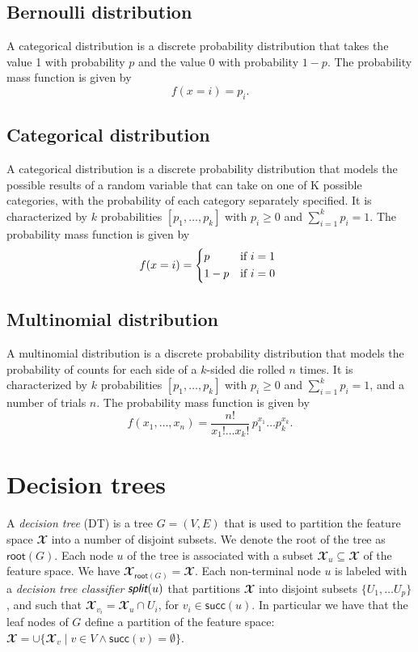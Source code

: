 \documentclass{article}
\newcommand{\func}[1]{\ensuremath{\textsf{#1}}} %
\newcommand{\attr}[1]{\ensuremath{\fontfamily{cmss}\selectfont \textit{#1}}} %
\begin{document}
\subsection{Bernoulli distribution}
A categorical distribution is a discrete probability distribution that takes the value 1 with probability $p$ and the value 0 with probability $1 - p$. The probability mass function is given by
\[
f(x = i) = p_i.
\]

\subsection{Categorical distribution}
A categorical distribution is a discrete probability distribution that models the possible results of a random variable that can take on one of K possible categories, with the probability of each category separately specified. It is characterized by $k$ probabilities $[p_1, \ldots, p_k]$ with $p_i \geq 0$ and $\sum_{i=1}^k p_i = 1$. The probability mass function is given by
\[
f(x = i) =
\begin{cases*}
  p & if $i = 1$ \\
  1 - p & if $i = 0$
\end{cases*}
\]

\subsection{Multinomial distribution}
A multinomial distribution is a discrete probability distribution that models the probability of counts for each side of a $k$-sided die rolled $n$ times. It is characterized by $k$ probabilities $[p_1, \ldots, p_k]$ with $p_i \geq 0$ and $\sum_{i=1}^k p_i = 1$, and a number of trials $n$. The probability mass function is given by
\[
f(x_1, \ldots, x_n) = \frac{n!}{x_1! \ldots x_k!} \, p_1^{x_1} \ldots p_k^{x_k}.
\]

\section{Decision trees}
A \emph{decision tree} (DT) is a tree $G = (V,E)$ that is used to partition the feature space $\mathbfcal{X}$ into a number of disjoint subsets. We denote the root of the tree as $\func{root}(G)$. Each node $u$ of the tree is associated with a subset $\mathbfcal{X}_u \subseteq \mathbfcal{X}$ of the feature space.
We have $\mathbfcal{X}_{\func{root}(G)} = \mathbfcal{X}$. Each non-terminal node $u$ is labeled with a \emph{decision tree classifier} $\attr{split}(u)$ that partitions $\mathbfcal{X}$ into disjoint subsets $\{ U_1, \ldots U_p \}$, and such that $\mathbfcal{X}_{v_i} = \mathbfcal{X}_{u} \cap U_i$, for $v_i \in \func{succ}(u)$.
In particular we have that the leaf nodes of $G$ define a partition of the feature space: $\mathbfcal{X} = \cup \{ \mathbfcal{X}_v \mid v \in V \land \func{succ}(v) = \emptyset \}$.
\end{document}
